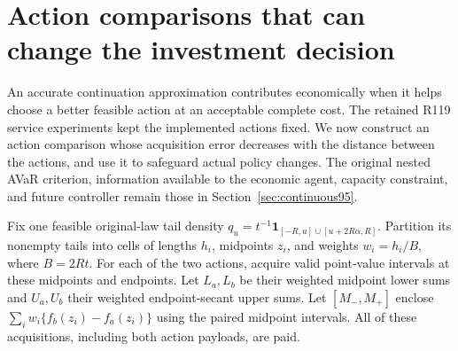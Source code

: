\section{Action comparisons that can change the investment decision}
\label{sec:improvement120}
An accurate continuation approximation contributes economically when it
helps choose a better feasible action at an acceptable complete cost.
The retained R119 service experiments kept the implemented actions fixed.
We now construct an action comparison whose acquisition error decreases
with the distance between the actions, and use it to safeguard actual
policy changes.  The original nested AVaR criterion, information available
to the economic agent, capacity constraint, and future controller remain
those in Section~\ref{sec:continuous95}.

Fix one feasible original-law tail density
$q_u=t^{-1}\boldsymbol1_{[-R,u]\cup[u+2R\alpha,R]}$.
Partition its nonempty tails into cells of lengths $h_i$, midpoints
$z_i$, and weights $w_i=h_i/B$, where $B=2Rt$.
For each of the two actions, acquire valid point-value intervals at
these midpoints and endpoints.  Let $L_a,L_b$ be their weighted
midpoint lower sums and $U_a,U_b$ their weighted endpoint-secant
upper sums.  Let $[M_-,M_+]$ enclose
$\sum_iw_i\{f_b(z_i)-f_a(z_i)\}$ using the paired midpoint intervals.
All of these acquisitions, including both action payloads, are paid.

